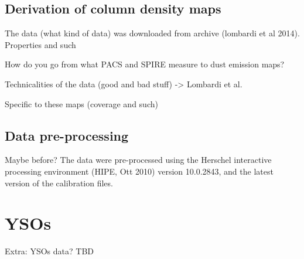 \subsection{Derivation of column density maps}

The data (what kind of data) was downloaded from archive (lombardi et al 2014). Properties and such

How do you go from what PACS and SPIRE measure to dust emission maps?





Technicalities of the data (good and bad stuff) -> Lombardi et al.

Specific to these maps (coverage and such)

\subsection{Data pre-processing}
Maybe before?
The data were pre-processed using the Herschel interactive processing environment (HIPE, Ott 2010) version 10.0.2843, and the latest version of the calibration files.

\section{YSOs}
Extra: YSOs data? TBD

